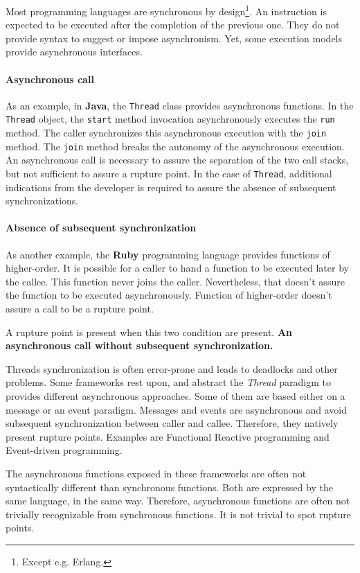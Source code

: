 Most programming languages are synchronous by design\footnote{Except e.g. Erlang.}.
An instruction is expected to be executed after the completion of the previous one.
They do not provide syntax to suggest or impose asynchronism.
Yet, some execution models provide asynchronous interfaces.

\paragraph{Asynchronous call}
As an example, in \textbf{Java}, the \texttt{Thread} class provides asynchronous functions.
In the \texttt{Thread} object, the \texttt{start} method invocation asynchronously executes the \texttt{run} method.
The caller synchronizes this asynchronous execution with the \texttt{join} method.
The \texttt{join} method breaks the autonomy of the asynchronous execution.
An asynchronous call is necessary to assure the separation of the two call stacks, but not sufficient to assure a rupture point.
In the case of \texttt{Thread}, additional indications from the developer is required to assure the absence of subsequent synchronizations.

\paragraph{Absence of subsequent synchronization}
As another example, the \textbf{Ruby} programming language provides functions of higher-order.
It is possible for a caller to hand a function to be executed later by the callee.
This function never joins the caller.
Nevertheless, that doesn't assure the function to be executed asynchronously.
Function of higher-order doesn't assure a call to be a rupture point.

A rupture point is present when this two condition are present.
\textbf{An asynchronous call without subsequent synchronization.}

Threads synchronization is often error-prone and leads to deadlocks and other problems.
Some frameworks rest upon, and abstract the \textit{Thread} paradigm to provides different asynchronous approaches.
Some of them are based either on a message or an event paradigm.
Messages and events are asynchronous and avoid subsequent synchronization between caller and callee.
Therefore, they natively present rupture points.
Examples are Functional Reactive programming\cite{Elliott1997} and Event-driven programming.

The asynchronous functions exposed in these frameworks are often not syntactically different than synchronous functions.
Both are expressed by the same language, in the same way.
Therefore, asynchronous functions are often not trivially recognizable from synchronous functions.
It is not trivial to spot rupture points.

